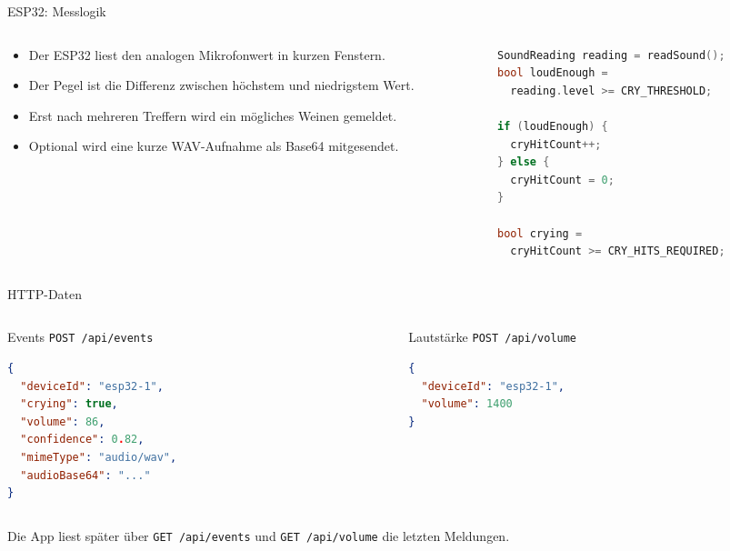 \documentclass[aspectratio=169,11pt]{beamer}
\newcommand{\apiendpoint}[1]{\texttt{#1}}
\begin{document}
\begin{frame}[fragile]{ESP32: Messlogik}
  \begin{columns}[T,totalwidth=\textwidth]
    \begin{column}{0.50\textwidth}
      \begin{itemize}
        \item Der ESP32 liest den analogen Mikrofonwert in kurzen Fenstern.
        \item Der Pegel ist die Differenz zwischen höchstem und niedrigstem Wert.
        \item Erst nach mehreren Treffern wird ein mögliches Weinen gemeldet.
        \item Optional wird eine kurze WAV-Aufnahme als Base64 mitgesendet.
      \end{itemize}
    \end{column}
    \begin{column}{0.46\textwidth}
\begin{lstlisting}[language=C++]
SoundReading reading = readSound();
bool loudEnough =
  reading.level >= CRY_THRESHOLD;

if (loudEnough) {
  cryHitCount++;
} else {
  cryHitCount = 0;
}

bool crying =
  cryHitCount >= CRY_HITS_REQUIRED;
\end{lstlisting}
    \end{column}
  \end{columns}
\end{frame}

\begin{frame}[fragile]{HTTP-Daten}
  \begin{columns}[T,totalwidth=\textwidth]
    \begin{column}{0.47\textwidth}
      \begin{block}{Events}
        \apiendpoint{POST /api/events}
        \begin{lstlisting}[language=json]
{
  "deviceId": "esp32-1",
  "crying": true,
  "volume": 86,
  "confidence": 0.82,
  "mimeType": "audio/wav",
  "audioBase64": "..."
}
        \end{lstlisting}
      \end{block}
    \end{column}
    \begin{column}{0.47\textwidth}
      \begin{block}{Lautstärke}
        \apiendpoint{POST /api/volume}
        \begin{lstlisting}[language=json]
{
  "deviceId": "esp32-1",
  "volume": 1400
}
        \end{lstlisting}
      \end{block}
    \end{column}
  \end{columns}

  \vspace{0.4em}
  \small
  Die App liest später über \apiendpoint{GET /api/events} und
  \apiendpoint{GET /api/volume} die letzten Meldungen.
\end{frame}
\end{document}

